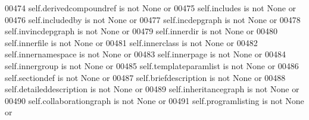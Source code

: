 \begin{DoxyCode}
{{{{{{{{{{{{{{{{{{{{{{{{{{{{{{{00474             self.derivedcompoundref \textcolor{keywordflow}{is} \textcolor{keywordflow}{not} \textcolor{keywordtype}{None} \textcolor{keywordflow}{or}
00475             self.includes \textcolor{keywordflow}{is} \textcolor{keywordflow}{not} \textcolor{keywordtype}{None} \textcolor{keywordflow}{or}
00476             self.includedby \textcolor{keywordflow}{is} \textcolor{keywordflow}{not} \textcolor{keywordtype}{None} \textcolor{keywordflow}{or}
00477             self.incdepgraph \textcolor{keywordflow}{is} \textcolor{keywordflow}{not} \textcolor{keywordtype}{None} \textcolor{keywordflow}{or}
00478             self.invincdepgraph \textcolor{keywordflow}{is} \textcolor{keywordflow}{not} \textcolor{keywordtype}{None} \textcolor{keywordflow}{or}
00479             self.innerdir \textcolor{keywordflow}{is} \textcolor{keywordflow}{not} \textcolor{keywordtype}{None} \textcolor{keywordflow}{or}
00480             self.innerfile \textcolor{keywordflow}{is} \textcolor{keywordflow}{not} \textcolor{keywordtype}{None} \textcolor{keywordflow}{or}
00481             self.innerclass \textcolor{keywordflow}{is} \textcolor{keywordflow}{not} \textcolor{keywordtype}{None} \textcolor{keywordflow}{or}
00482             self.innernamespace \textcolor{keywordflow}{is} \textcolor{keywordflow}{not} \textcolor{keywordtype}{None} \textcolor{keywordflow}{or}
00483             self.innerpage \textcolor{keywordflow}{is} \textcolor{keywordflow}{not} \textcolor{keywordtype}{None} \textcolor{keywordflow}{or}
00484             self.innergroup \textcolor{keywordflow}{is} \textcolor{keywordflow}{not} \textcolor{keywordtype}{None} \textcolor{keywordflow}{or}
00485             self.templateparamlist \textcolor{keywordflow}{is} \textcolor{keywordflow}{not} \textcolor{keywordtype}{None} \textcolor{keywordflow}{or}
00486             self.sectiondef \textcolor{keywordflow}{is} \textcolor{keywordflow}{not} \textcolor{keywordtype}{None} \textcolor{keywordflow}{or}
00487             self.briefdescription \textcolor{keywordflow}{is} \textcolor{keywordflow}{not} \textcolor{keywordtype}{None} \textcolor{keywordflow}{or}
00488             self.detaileddescription \textcolor{keywordflow}{is} \textcolor{keywordflow}{not} \textcolor{keywordtype}{None} \textcolor{keywordflow}{or}
00489             self.inheritancegraph \textcolor{keywordflow}{is} \textcolor{keywordflow}{not} \textcolor{keywordtype}{None} \textcolor{keywordflow}{or}
00490             self.collaborationgraph \textcolor{keywordflow}{is} \textcolor{keywordflow}{not} \textcolor{keywordtype}{None} \textcolor{keywordflow}{or}
00491             self.programlisting \textcolor{keywordflow}{is} \textcolor{keywordflow}{not} \textcolor{keywordtype}{None} \textcolor{keywordflow}{or}
}}}}}}}}}}}}}}}}}}}}}}}}}}}}}}}
\end{DoxyCode}

